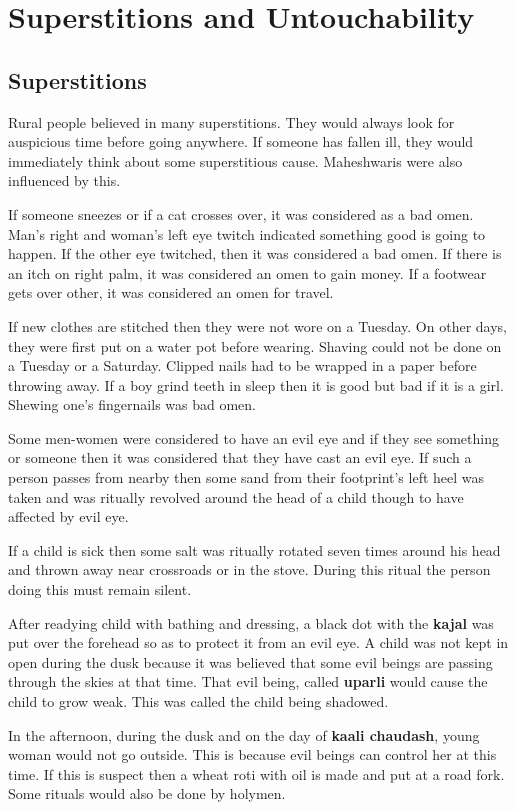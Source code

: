 \chapter{Superstitions and Untouchability}
\section{Superstitions}
Rural people believed in many superstitions. They would always look for
auspicious time before going anywhere. If someone has fallen ill, they would
immediately think about some superstitious cause. Maheshwaris were also
influenced by this.

If someone sneezes or if a cat crosses over, it was considered as a bad omen.
Man's right and woman's left eye twitch indicated something good is going to
happen. If the other eye twitched, then it was considered a bad omen. If there
is an itch on right palm, it was considered an omen to gain money. If a
footwear gets over other, it was considered an omen for travel.

If new clothes are stitched then they were not wore on a Tuesday. On other
days, they were first put on a water pot before wearing. Shaving could not be
done on a Tuesday or a Saturday. Clipped nails had to be wrapped in a paper
before throwing away. If a boy grind teeth in sleep then it is good but bad if
it is a girl. Shewing one's fingernails was bad omen.

Some men-women were considered to have an evil eye and if they see something or
someone then it was considered that they have cast an evil eye. If such a
person passes from nearby then some sand from their footprint's left heel was
taken and was ritually revolved around the head of a child though to have
affected by evil eye.

If a child is sick then some salt was ritually rotated seven times around his
head and thrown away near crossroads or in the stove. During this ritual the
person doing this must remain silent.

After readying child with bathing and dressing, a black dot with the
\textbf{kajal} was put over the forehead so as to protect it from an evil eye.
A child was not kept in open during the dusk because it was believed that some
evil beings are passing through the skies at that time. That evil being, called
\textbf{uparli} would cause the child to grow weak. This was called the child
being shadowed.

In the afternoon, during the dusk and on the day of \textbf{kaali chaudash},
young woman would not go outside. This is because evil beings can control her
at this time. If this is suspect then a wheat roti with oil is made and put at
a road fork. Some rituals would also be done by holymen.

